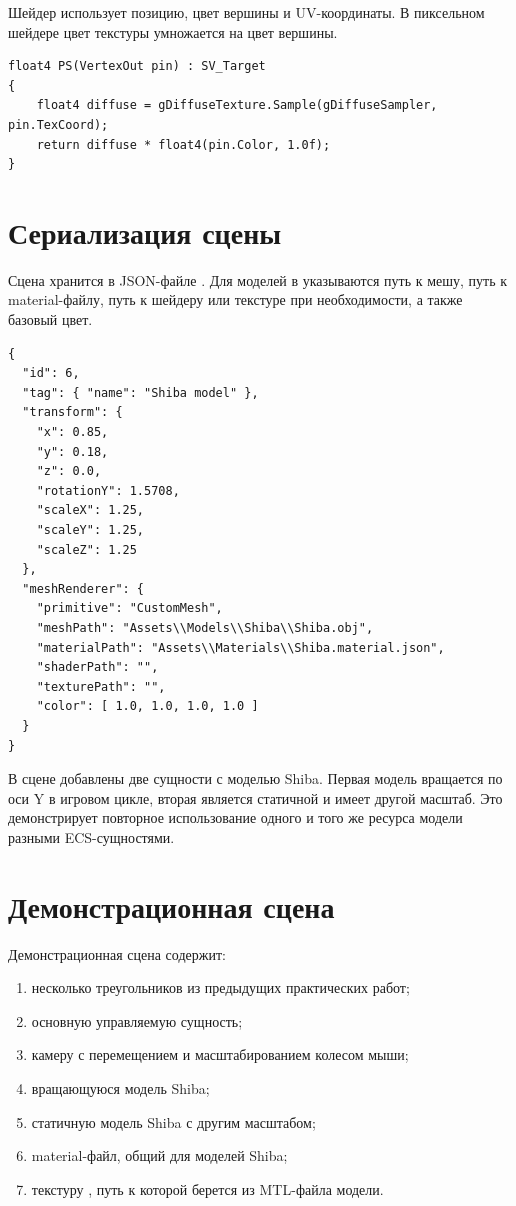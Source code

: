 \documentclass[14pt,a4paper]{extarticle}
\begin{document}
Шейдер  использует позицию, цвет вершины и UV-координаты. В пиксельном шейдере цвет
текстуры умножается на цвет вершины.

\begin{lstlisting}[style=cppgost,caption={Фрагмент пиксельного шейдера}]
float4 PS(VertexOut pin) : SV_Target
{
    float4 diffuse = gDiffuseTexture.Sample(gDiffuseSampler, pin.TexCoord);
    return diffuse * float4(pin.Color, 1.0f);
}
\end{lstlisting}

\section{Сериализация сцены}

Сцена хранится в JSON-файле . Для моделей в
 указываются путь к мешу, путь к material-файлу, путь к шейдеру или текстуре при
необходимости, а также базовый цвет.

\begin{lstlisting}[style=jsongost,caption={Фрагмент сцены с моделью Shiba}]
{
  "id": 6,
  "tag": { "name": "Shiba model" },
  "transform": {
    "x": 0.85,
    "y": 0.18,
    "z": 0.0,
    "rotationY": 1.5708,
    "scaleX": 1.25,
    "scaleY": 1.25,
    "scaleZ": 1.25
  },
  "meshRenderer": {
    "primitive": "CustomMesh",
    "meshPath": "Assets\\Models\\Shiba\\Shiba.obj",
    "materialPath": "Assets\\Materials\\Shiba.material.json",
    "shaderPath": "",
    "texturePath": "",
    "color": [ 1.0, 1.0, 1.0, 1.0 ]
  }
}
\end{lstlisting}

В сцене добавлены две сущности с моделью Shiba. Первая модель вращается по оси Y в игровом цикле, вторая
является статичной и имеет другой масштаб. Это демонстрирует повторное использование одного и того же
ресурса модели разными ECS-сущностями.

\section{Демонстрационная сцена}

Демонстрационная сцена содержит:

\begin{enumerate}
  \item несколько треугольников из предыдущих практических работ;
  \item основную управляемую сущность;
  \item камеру с перемещением и масштабированием колесом мыши;
  \item вращающуюся модель Shiba;
  \item статичную модель Shiba с другим масштабом;
  \item material-файл, общий для моделей Shiba;
  \item текстуру , путь к которой берется из MTL-файла модели.
\end{enumerate}
\end{document}
